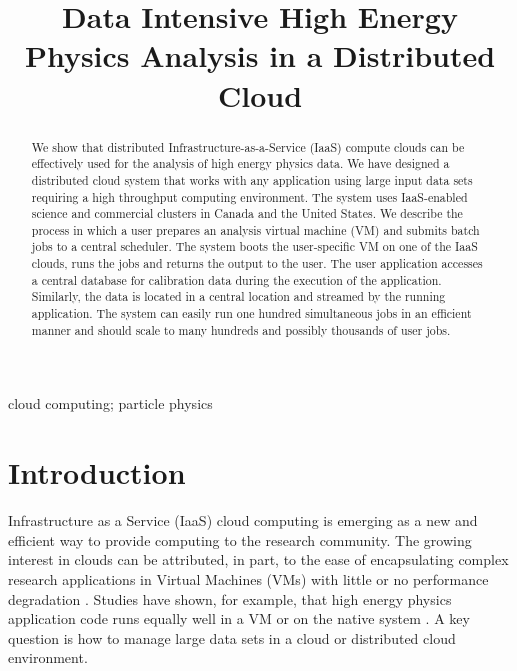 \documentclass[10pt, conference, compsocconf]{IEEEtran}
\begin{document}
\title{Data Intensive High Energy Physics Analysis in a Distributed Cloud}
\author{
\vspace{0.5cm}
}
\maketitle


\begin{abstract}
We show that distributed Infrastructure-as-a-Service (IaaS)
compute clouds can be effectively used for the analysis of high 
energy physics data. 
We have designed a distributed cloud system that works with any 
application using large input data sets requiring a high 
throughput computing environment.
The system uses IaaS-enabled science and commercial clusters 
in Canada and the United States.
We describe the process in which a user prepares an analysis virtual machine (VM)
and submits batch jobs to a central scheduler.
The system boots the user-specific VM on one of the IaaS clouds, runs the jobs 
and returns the output to the user.
The user application accesses a central database for calibration data during
the execution of the application.
Similarly, the data is located in a central location and streamed by the running
application.
The system can easily run one hundred simultaneous jobs in an efficient 
manner and should scale to many hundreds and possibly thousands of user jobs.
\end{abstract}

\begin{IEEEkeywords}
cloud computing; particle physics
\end{IEEEkeywords}
\IEEEpeerreviewmaketitle



\section{Introduction}

Infrastructure as a Service (IaaS) cloud computing is emerging as a new 
and efficient way to provide computing to the research community.
The growing interest in clouds can be attributed, in part, to the ease of 
encapsulating complex research applications in Virtual Machines (VMs)
with little or no performance degradation \cite{hepix-vm-benchmark}.
Studies have shown, for example, that high energy physics application code 
runs equally well in a VM or on the native system \cite{chep-vm}.
A key question is how to manage large data sets in a cloud
or distributed cloud environment.   
\end{document}
